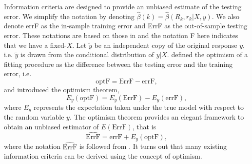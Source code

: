Information criteria are designed to provide an unbiased estimate of the testing error. We simplify the notation by denoting $\hat\beta(k) = \hat{\beta}(R_k,r_k|X,y)$. We also denote errF as the in-sample training error and ErrF as the out-of-sample testing error. These notations are based on those in \citet{efron2004estimation} and the notation F here indicates that we have a fixed-$X$. Let $\tilde{y}$ be an independent copy of the original response $y$, i.e. $\tilde{y}$ is drawn from the conditional distribution of $y|X$. \citet{efron1986biased} defined the optimism of a fitting procedure as the difference between the testing error and the training error, i.e.
\begin{equation*}
\text{optF} = \text{ErrF} - \text{errF},
\end{equation*}
and introduced the optimism theorem,
\begin{equation*}
E_y(\text{optF}) = E_y(\text{ErrF}) - E_y(\text{errF}),
\end{equation*}
where $E_y$ represents the expectation taken under the true model with respect to the random variable $y$. The optimism theorem provides an elegant framework to obtain an unbiased estimator of $E(\text{ErrF})$, 
that is
\begin{equation*}
\widehat{\text{ErrF}} = \text{errF} + E_y(\text{optF}),
\end{equation*}
where the notation $\widehat{\text{ErrF}}$ is followed from \citet{efron2004estimation}. It turns out that many existing information criteria can be derived using the concept of optimism. 

